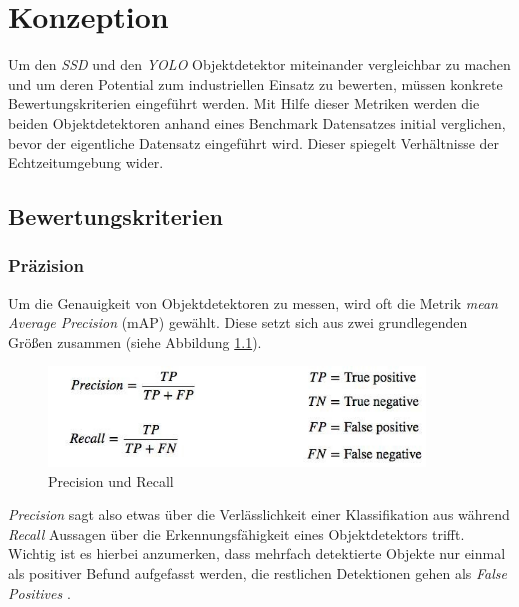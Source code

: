 \chapter{Konzeption}


Um den \textit{SSD} und den \textit{YOLO} Objektdetektor miteinander vergleichbar zu machen und um deren Potential zum industriellen Einsatz zu bewerten, müssen konkrete Bewertungskriterien eingeführt werden. Mit Hilfe dieser Metriken werden die beiden Objektdetektoren anhand eines Benchmark Datensatzes initial verglichen, bevor der eigentliche Datensatz eingeführt wird. Dieser spiegelt Verhältnisse der Echtzeitumgebung wider. 

\section{Bewertungskriterien}

\subsection*{Präzision}

Um die Genauigkeit von Objektdetektoren zu messen, wird oft die Metrik \textit{mean Average Precision} (mAP) gewählt. Diese setzt sich aus zwei grundlegenden Größen zusammen (siehe Abbildung \ref{metrics}). 

\begin{figure}[ht]
	\begin{center}
		\includegraphics[width=10cm]{Bilder/metrics.png} 
		\caption[Precision und Recall Metrik]{Precision und Recall \cite{JonathanHui.20180307}}
		\label{metrics}
	\end{center}
\end{figure}

\textit{Precision} sagt also etwas über die Verlässlichkeit einer Klassifikation aus während \textit{Recall} Aussagen über die Erkennungsfähigkeit eines Objektdetektors trifft. Wichtig ist es hierbei anzumerken, dass mehrfach detektierte Objekte nur einmal als positiver Befund aufgefasst werden, die restlichen Detektionen gehen als \textit{False Positives} \cite{TarangShah.20180127}.

